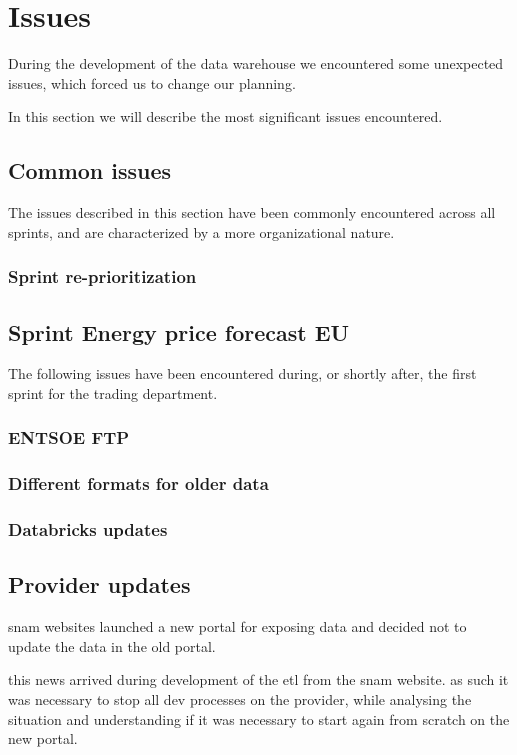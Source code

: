 \chapter{Issues} \label{section:issues}
    During the development of the data warehouse we encountered some unexpected issues, which forced us to change our planning.\reword
    
    In this section we will describe the most significant issues encountered.
    
    \section{Common issues}
        The issues described in this section have been commonly encountered across all sprints, and are characterized by a more organizational nature.
        
        \subsection{Sprint re-prioritization}
            
    
    \section{Sprint Energy price forecast EU}
        The following issues have been encountered during, or shortly after, the first sprint for the trading department.
        
        \subsection{ENTSOE FTP} \label{section:issues:entsoe_ftp}
            
        \subsection{Different formats for older data} \label{section:issues:older_data_formats}
            
        \subsection{Databricks updates} \label{section:issues:databricks_updates}
            
    
    \section{Provider updates}
            snam websites launched a new portal for exposing data and decided not to update the data in the old portal.
            
            this news arrived during development of the etl from the snam website.
            as such it was necessary to stop all dev processes on the provider, while analysing the situation and understanding if it was necessary to start again from scratch on the new portal.